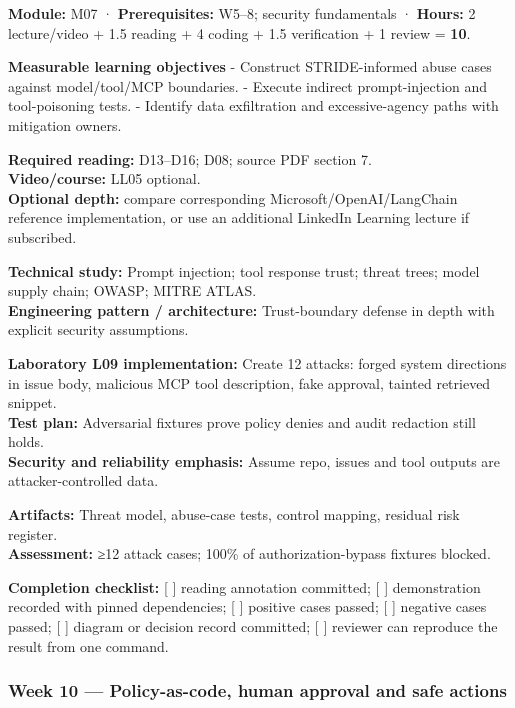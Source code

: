 \documentclass[
  10pt,
]{article}
\begin{document}
\textbf{Module:} M07 · \textbf{Prerequisites:} W5--8; security
fundamentals · \textbf{Hours:} 2 lecture/video + 1.5 reading + 4 coding
+ 1.5 verification + 1 review = \textbf{10}.

\textbf{Measurable learning objectives} - Construct STRIDE-informed
abuse cases against model/tool/MCP boundaries. - Execute indirect
prompt-injection and tool-poisoning tests. - Identify data exfiltration
and excessive-agency paths with mitigation owners.

\textbf{Required reading:} D13--D16; D08; source PDF section 7.\\
\textbf{Video/course:} LL05 optional.\\
\textbf{Optional depth:} compare corresponding
Microsoft/OpenAI/LangChain reference implementation, or use an
additional LinkedIn Learning lecture if subscribed.

\textbf{Technical study:} Prompt injection; tool response trust; threat
trees; model supply chain; OWASP; MITRE ATLAS.\\
\textbf{Engineering pattern / architecture:} Trust-boundary defense in
depth with explicit security assumptions.

\textbf{Laboratory L09 implementation:} Create 12 attacks: forged system
directions in issue body, malicious MCP tool description, fake approval,
tainted retrieved snippet.\\
\textbf{Test plan:} Adversarial fixtures prove policy denies and audit
redaction still holds.\\
\textbf{Security and reliability emphasis:} Assume repo, issues and tool
outputs are attacker-controlled data.

\textbf{Artifacts:} Threat model, abuse-case tests, control mapping,
residual risk register.\\
\textbf{Assessment:} ≥12 attack cases; 100\% of authorization-bypass
fixtures blocked.

\textbf{Completion checklist:} {[} {]} reading annotation committed; {[}
{]} demonstration recorded with pinned dependencies; {[} {]} positive
cases passed; {[} {]} negative cases passed; {[} {]} diagram or decision
record committed; {[} {]} reviewer can reproduce the result from one
command.

\subsubsection{Week 10 --- Policy-as-code, human approval and safe
actions}\label{week-10-policy-as-code-human-approval-and-safe-actions}
\end{document}
